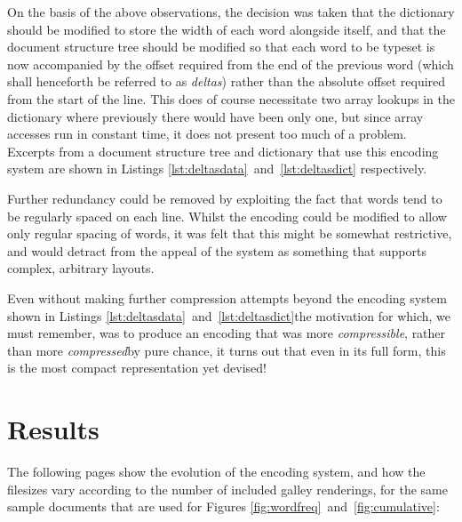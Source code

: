 On the basis of the above observations, the decision was taken that the dictionary should be modified to store the width of each word alongside itself, and that the document structure tree should be modified so that each word to be typeset is now accompanied by the offset required from the end of the previous word (which shall henceforth be referred to as \emph{deltas}) rather than the absolute offset required from the start of the line. This does of course necessitate two array lookups in the dictionary where previously there would have been only one, but since array accesses run in constant time, it does not present too much of a problem. Excerpts from a document structure tree and dictionary that use this encoding system are shown in Listings \ref{lst:deltasdata}~and~\ref{lst:deltasdict} respectively.

Further redundancy could be removed by exploiting the fact that words tend to be regularly spaced on each line. Whilst the encoding could be modified to allow only regular spacing of words, it was felt that this might be somewhat restrictive, and would detract from the appeal of the system as something that supports complex, arbitrary layouts.

Even without making further compression attempts beyond the encoding system shown in Listings \ref{lst:deltasdata}~and~\ref{lst:deltasdict}\ed the motivation for which, we must remember, was to produce an encoding that was more \emph{compressible}, rather than more \emph{compressed}\ed by pure chance, it turns out that even in its full form, this is the most compact representation yet devised!



\newpage
\section{Results}

The following pages show the evolution of the encoding system, and how the filesizes vary according to the number of included galley renderings, for the same sample documents that are used for Figures \ref{fig:wordfreq}~and~\ref{fig:cumulative}:

